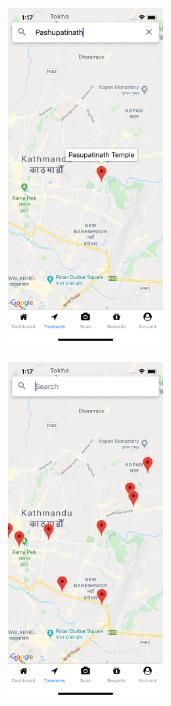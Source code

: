 \documentclass[12pt, a4paper, oneside]{article}
\begin{document}
\begin{figure}[H]

\begin{subfigure}{.5\textwidth}
    \centering
    \includegraphics[width=0.45\textwidth]{test-evidences/treasure/a.png}
    \caption{}
\end{subfigure}%
\begin{subfigure}{.5\textwidth}
    \centering
    \includegraphics[width=0.45\textwidth]{test-evidences/treasure/b.png}
    \caption{}
\end{subfigure}


\end{figure}
\end{document}
